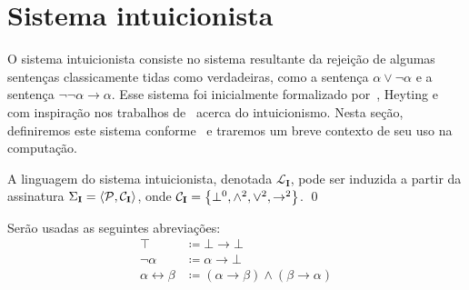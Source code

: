 \section{Sistema intuicionista}

    O sistema intuicionista consiste no sistema resultante da rejeição de algumas sentenças classicamente tidas como verdadeiras, como a sentença $\alpha\vee\neg\alpha$ e a sentença $\neg\neg\alpha\to\alpha$.
    Esse sistema foi inicialmente formalizado por~\cite{Kolmogorov}, Heyting e~\cite{Glivenko-A, Glivenko-B} com inspiração nos trabalhos de~\cite{Brouwer-A, Brouwer-B} acerca do intuicionismo.
    Nesta seção, definiremos este sistema conforme~\cite{Troelstra} e traremos um breve contexto de seu uso na computação.

    \begin{definition}
        A linguagem do sistema intuicionista, denotada $\mathcal{L}_\mathbf{I}$, pode ser induzida a partir da assinatura $\Sigma_\mathbf{I}=\langle\mathcal{P},\mathcal{C}_\mathbf{I}\rangle$, onde $\mathcal{C}_\mathbf{I}=\left\{\bot^0,\wedge^2,\vee^2,\to^2\right\}$.
        \qed{}
    \end{definition}

    \begin{notation}
        Serão usadas as seguintes abreviações:
        \begin{align*}
            \top&\coloneqq\bot\to\bot\\
            \neg\alpha&\coloneqq\alpha\to\bot\\
            \alpha\leftrightarrow\beta&\coloneqq(\alpha\to\beta)\wedge(\beta\to\alpha)
        \end{align*}
    \end{notation}

